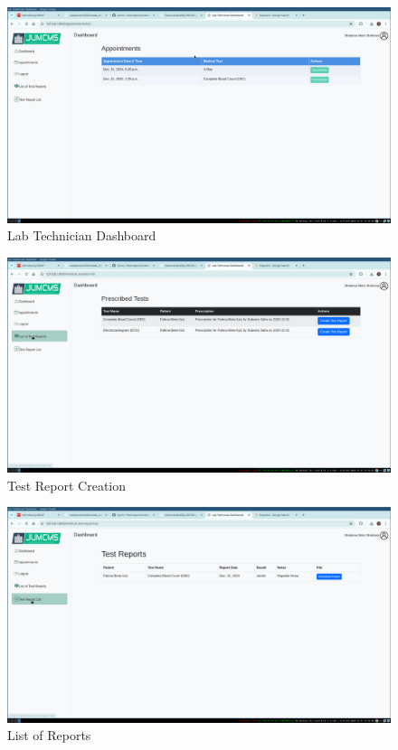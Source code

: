 \documentclass[a4paper,12pt]{article}
\begin{document}
\begin{figure}[H]
    \centering
    \includegraphics[width=1\textwidth]{images/sprintoutput03.png}
    \caption{Lab Technician Dashboard}
    \label{fig:labtechniciandashboard}
\end{figure}

\begin{figure}[H]
    \centering
    \includegraphics[width=1\textwidth]{images/sprintoutput05.png}
    \caption{Test Report Creation}
    \label{fig:reportcreation}
\end{figure}

\begin{figure}[H]
    \centering
    \includegraphics[width=1\textwidth]{images/sprintoutput06.png}
    \caption{List of Reports}
    \label{fig:reportlist}
\end{figure}
\end{document}
